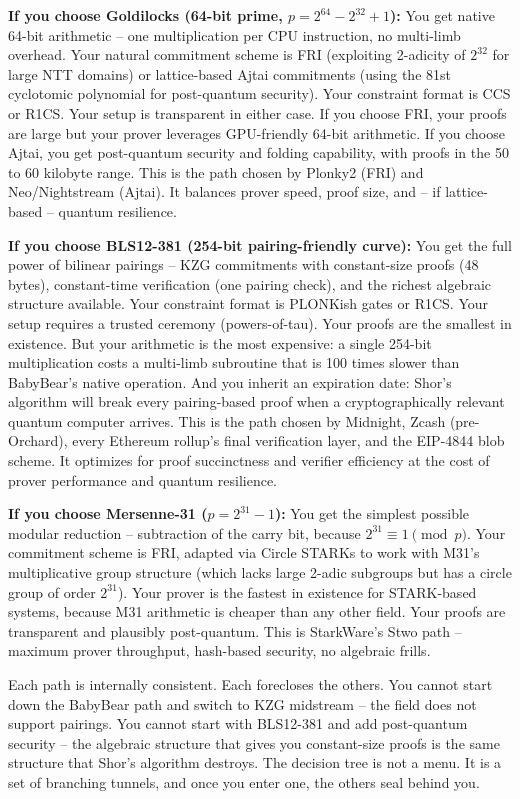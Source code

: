 \documentclass[
  11pt,
  openany]{report}
\renewcommand{\textbf}[1]{{\bfseries\color{MidnightBold}#1}}
\begin{document}
\textbf{If you choose Goldilocks (64-bit prime, \(p = 2^{64} - 2^{32} + 1\)):}
You get native 64-bit arithmetic -- one multiplication per CPU instruction, no
multi-limb overhead. Your natural commitment scheme is FRI (exploiting 2-adicity
of \(2^{32}\) for large NTT domains) or lattice-based Ajtai commitments (using
the 81st cyclotomic polynomial for post-quantum security). Your constraint
format is CCS or R1CS. Your setup is transparent in either case. If you choose
FRI, your proofs are large but your prover leverages GPU-friendly 64-bit
arithmetic. If you choose Ajtai, you get post-quantum security and folding
capability, with proofs in the 50 to 60 kilobyte range. This is the path chosen
by Plonky2 (FRI) and Neo/Nightstream (Ajtai). It balances prover speed, proof
size, and -- if lattice-based -- quantum resilience.

\textbf{If you choose BLS12-381 (254-bit pairing-friendly curve):} You get the
full power of bilinear pairings -- KZG commitments with constant-size proofs (48
bytes), constant-time verification (one pairing check), and the richest
algebraic structure available. Your constraint format is PLONKish gates or R1CS.
Your setup requires a trusted ceremony (powers-of-tau). Your proofs are the
smallest in existence. But your arithmetic is the most expensive: a single
254-bit multiplication costs a multi-limb subroutine that is 100 times slower
than BabyBear's native operation. And you inherit an expiration date: Shor's
algorithm will break every pairing-based proof when a cryptographically relevant
quantum computer arrives. This is the path chosen by Midnight, Zcash
(pre-Orchard), every Ethereum rollup's final verification layer, and the
EIP-4844 blob scheme. It optimizes for proof succinctness and verifier
efficiency at the cost of prover performance and quantum resilience.

\textbf{If you choose Mersenne-31 (\(p = 2^{31} - 1\)):} You get the simplest
possible modular reduction -- subtraction of the carry bit, because
\(2^{31} \equiv 1 \pmod{p}\). Your commitment scheme is FRI, adapted via Circle
STARKs to work with M31's multiplicative group structure (which lacks large
2-adic subgroups but has a circle group of order \(2^{31}\)). Your prover is the
fastest in existence for STARK-based systems, because M31 arithmetic is cheaper
than any other field. Your proofs are transparent and plausibly post-quantum.
This is StarkWare's Stwo path -- maximum prover throughput, hash-based security,
no algebraic frills.

Each path is internally consistent. Each forecloses the others. You cannot start
down the BabyBear path and switch to KZG midstream -- the field does not support
pairings. You cannot start with BLS12-381 and add post-quantum security -- the
algebraic structure that gives you constant-size proofs is the same structure
that Shor's algorithm destroys. The decision tree is not a menu. It is a set of
branching tunnels, and once you enter one, the others seal behind you.
\end{document}
